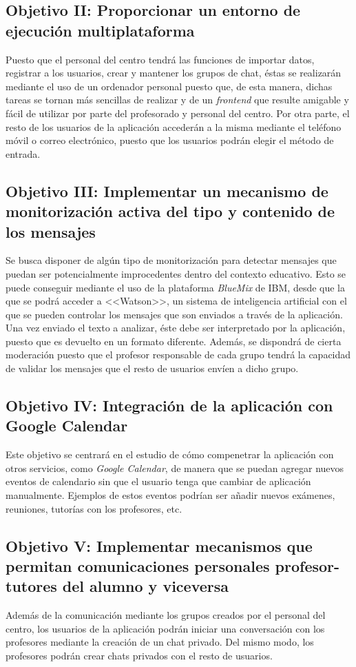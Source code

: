 \subsection{Objetivo II: Proporcionar un entorno de ejecución multiplataforma}
Puesto que el personal del centro tendrá las funciones de importar datos, registrar a los usuarios, crear y mantener los grupos de chat, éstas se realizarán mediante el uso de un ordenador personal puesto que, de esta manera, dichas tareas se tornan más sencillas de realizar y de un \textit{frontend} que resulte amigable y fácil de utilizar por parte del profesorado y personal del centro. Por otra parte, el resto de los usuarios de la aplicación accederán a la misma mediante el teléfono móvil o correo electrónico, puesto que los usuarios podrán elegir el método de entrada.

\subsection{Objetivo III: Implementar un mecanismo de monitorización activa del tipo y contenido de los mensajes}
Se busca disponer de algún tipo de monitorización para detectar mensajes que puedan ser potencialmente improcedentes dentro del contexto educativo. Esto se puede conseguir mediante el uso de la plataforma \textit{BlueMix} de IBM, desde que la que se podrá acceder a <<Watson>>, un sistema de inteligencia artificial con el que se pueden controlar los mensajes que son enviados a través de la aplicación. Una vez enviado el texto a analizar, éste debe ser interpretado por la aplicación, puesto que es devuelto en un formato diferente. Además, se dispondrá de cierta moderación puesto que el profesor responsable de cada grupo tendrá la capacidad de validar los mensajes que el resto de usuarios envíen a dicho grupo.

\subsection{Objetivo IV: Integración de la aplicación con Google Calendar}
Este objetivo se centrará en el estudio de cómo compenetrar la aplicación con otros servicios, como \textit{Google Calendar}, de manera que se puedan agregar nuevos eventos de calendario sin que el usuario tenga que cambiar de aplicación manualmente. Ejemplos de estos eventos podrían ser añadir nuevos exámenes, reuniones, tutorías con los profesores, etc.

\subsection{Objetivo V: Implementar mecanismos que permitan comunicaciones personales profesor-tutores del alumno y viceversa}
Además de la comunicación mediante los grupos creados por el personal del centro, los usuarios de la aplicación podrán iniciar una conversación con los profesores mediante la creación de un chat privado. Del mismo modo, los profesores podrán crear chats privados con el resto de usuarios.

